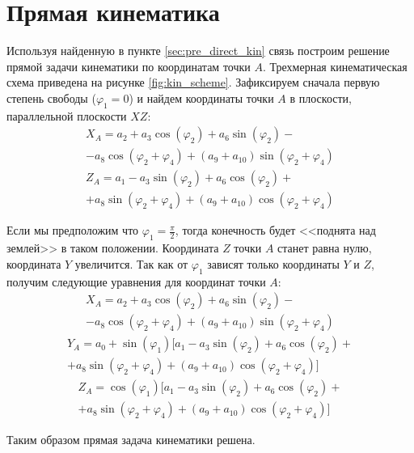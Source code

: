 \section{Прямая кинематика}\label{sec:direct_kinematics}
Используя найденную в пункте \ref{sec:pre_direct_kin} связь построим решение прямой задачи кинематики по координатам точки $ A $. Трехмерная кинематическая схема приведена на рисунке \ref{fig:kin_scheme}. Зафиксируем сначала первую степень свободы ($ \varphi_1 = 0 $) и найдем координаты точки $ A $ в плоскости, параллельной плоскости $ XZ $:
\begin{multline}
    X_A=a_2+a_3\cos(\varphi_2)+a_6\sin(\varphi_2)-\\-a_8 \cos(\varphi _2+\varphi _4)+(a_9+a_{10}) \sin(\varphi _2+\varphi _4) 
\end{multline}
\begin{multline}
    Z_A=a_1-a_3 \sin(\varphi _2)+a_6 \cos(\varphi _2)+\\+a_8 \sin(\varphi _2+\varphi _4)+(a_9+a_{10}) \cos(\varphi _2+\varphi _4)
\end{multline}

\noindent Если мы предположим что $ \varphi_1 = \frac \pi 2 $, тогда конечность будет <<поднята над землей>> в таком положении. Координата $ Z $ точки $ A $ станет равна нулю, координата $ Y $ увеличится. Так как от $ \varphi_1 $ зависят только координаты $Y$ и $Z$, получим следующие уравнения для координат точки $A$:
\begin{multline}
    X_A=a_2+a_3\cos(\varphi_2)+a_6\sin(\varphi_2)-\\-a_8 \cos(\varphi _2+\varphi _4)+(a_9+a_{10}) \sin(\varphi _2+\varphi _4) 
\end{multline}
\begin{multline}
    Y_A=a_0+\sin(\varphi_1)[a_1-a_3 \sin(\varphi _2)+a_6 \cos(\varphi _2)+\\+a_8 \sin(\varphi _2+\varphi _4)+(a_9+a_{10}) \cos(\varphi _2+\varphi _4)]
\end{multline}
\begin{multline}
    Z_A=\cos(\varphi_1)[a_1-a_3 \sin(\varphi _2)+a_6 \cos(\varphi _2)+\\+a_8 \sin(\varphi _2+\varphi _4)+(a_9+a_{10}) \cos(\varphi _2+\varphi _4)]
\end{multline}

\noindent Таким образом прямая задача кинематики решена.

